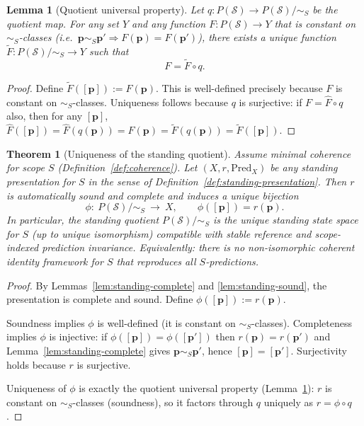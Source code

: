 \documentclass[11pt]{article}
\newtheorem{theorem}[definition]{Theorem}
\newtheorem{lemma}[definition]{Lemma}
\theoremstyle{remark}
\newcommand{\Skin}{\mathcal{S}}
\begin{document}
\begin{lemma}[Quotient universal property]\label{lem:quotient-universal}
Let $q:P(\Skin)\to P(\Skin)/\!\sim_S$ be the quotient map.
For any set $Y$ and any function $F:P(\Skin)\to Y$ that is constant on $\sim_S$-classes
(i.e.\ $\mathbf{p}\sim_S\mathbf{p}'\Rightarrow F(\mathbf{p})=F(\mathbf{p}')$),
there exists a unique function $\widetilde F:P(\Skin)/\!\sim_S\to Y$ such that
\[
F=\widetilde F\circ q.
\]
\end{lemma}

\begin{proof}
Define $\widetilde F([\mathbf{p}]):=F(\mathbf{p})$.
This is well-defined precisely because $F$ is constant on $\sim_S$-classes.
Uniqueness follows because $q$ is surjective: if $F=\widehat F\circ q$ also, then for any $[\mathbf{p}]$,
$\widehat F([\mathbf{p}])=\widehat F(q(\mathbf{p}))=F(\mathbf{p})=\widetilde F(q(\mathbf{p}))=\widetilde F([\mathbf{p}])$.
\end{proof}

\begin{theorem}[Uniqueness of the standing quotient]\label{thm:standing-quotient-unique}
Assume minimal coherence for scope $S$ (Definition~\ref{def:coherence}).
Let $(X,r,\mathrm{Pred}_X)$ be any standing presentation for $S$ in the sense of
Definition~\ref{def:standing-presentation}.
Then $r$ is automatically sound and complete and induces a unique bijection
\[
\phi:\ P(\Skin)/\!\sim_S\ \longrightarrow\ X,\qquad \phi([\mathbf{p}])=r(\mathbf{p}).
\]
In particular, the standing quotient $P(\Skin)/\!\sim_S$ is the \emph{unique} standing state space for $S$
(up to unique isomorphism) compatible with stable reference and scope-indexed prediction invariance.
Equivalently: there is no non-isomorphic coherent identity framework for $S$ that reproduces all $S$-predictions.
\end{theorem}

\begin{proof}
By Lemmas~\ref{lem:standing-complete} and \ref{lem:standing-sound}, the presentation is complete and sound.
Define $\phi([\mathbf{p}]):=r(\mathbf{p})$.

Soundness implies $\phi$ is well-defined (it is constant on $\sim_S$-classes).
Completeness implies $\phi$ is injective: if $\phi([\mathbf{p}])=\phi([\mathbf{p}'])$ then
$r(\mathbf{p})=r(\mathbf{p}')$ and Lemma~\ref{lem:standing-complete} gives $\mathbf{p}\sim_S\mathbf{p}'$, hence
$[\mathbf{p}]=[\mathbf{p}']$.
Surjectivity holds because $r$ is surjective.

Uniqueness of $\phi$ is exactly the quotient universal property (Lemma~\ref{lem:quotient-universal}):
$r$ is constant on $\sim_S$-classes (soundness), so it factors through $q$ uniquely as $r=\phi\circ q$.
\end{proof}
\end{document}
